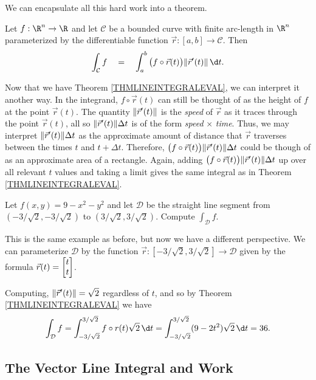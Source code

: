 We can encapsulate all this hard work into a theorem.

\begin{theorem}
	\label{THMLINEINTEGRALEVAL}
	Let $f:\R^n\to \R$ and let $\mathcal C$ be a bounded curve with finite
	arc-length
	in $\R^n$ parameterized by the differentiable function $\vec r:[a,b]\to\mathcal C$.  
	Then
	\[
		\int_{\mathcal C} f \quad=\quad \int_{a}^b \big(f\circ \vec r(t)\big)\norm{\vec r'(t)}\,\d t.
	\]
\end{theorem}

Now that we have Theorem \ref{THMLINEINTEGRALEVAL}, we can interpret it another way.
In the integrand, $f\circ \vec r(t)$ can still be thought of as the height of
$f$ at the point $\vec r(t)$.  The quantity $\lVert\vec r'(t)\rVert$
is the \emph{speed} of $\vec r$ as it traces through the point $\vec r(t)$,
all so $\lVert\vec r'(t)\rVert\Delta t$ is of the form \emph{speed}$\,\times\,$\emph{time}.
Thus, we may interpret $\lVert\vec r'(t)\rVert\Delta t$ as the approximate amount of distance
that $\vec r$ traverses between the times $t$ and $t+\Delta t$.  Therefore, 
$\big(f\circ \vec r(t)\big)\lVert\vec r'(t)\rVert\Delta t$ could be though of as an approximate
area of a rectangle.  Again, adding $\big(f\circ \vec r(t)\big)\lVert\vec r'(t)\rVert\Delta t$ up
over all relevant $t$ values and taking a limit gives 
the same integral as in Theorem \ref{THMLINEINTEGRALEVAL}.

\begin{example}
	Let $f(x,y) = 9-x^2-y^2$ and let $\mathcal D$ be the straight line segment
	from $(-3/\sqrt{2},-3/\sqrt{2})$ to $(3/\sqrt{2},3/\sqrt{2})$.  Compute
	$\int_{\mathcal D} f$.

	This is the same example as before, but now we have a different perspective.
	We can parameterize $\mathcal D$ by the function $\vec r:[-3/\sqrt{2},3/\sqrt{2}]\to
	\mathcal D$ given by the formula $\vec r(t)=\mat{t\\t}$.

	Computing, $\lVert\vec r'(t)\rVert = \sqrt{2}$ regardless of $t$, and so by Theorem
	\ref{THMLINEINTEGRALEVAL} we have
	\[
		\int_{\mathcal D} f = \int_{-3/\sqrt{2}}^{3/\sqrt{2}} f\circ r(t)\sqrt{2}\,\d t
		=\int_{-3/\sqrt{2}}^{3/\sqrt{2}} (9-2t^2)\sqrt{2}\,\d t = 36.
	\]
\end{example}


\subsection{The Vector Line Integral and Work}

